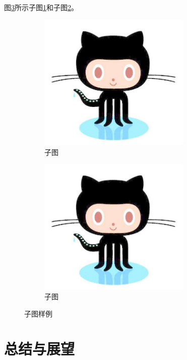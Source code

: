 \documentclass[winfonts,phd,twoside]{njuthesis}
\begin{document}
图\ref{fig:sub}所示子图\ref{subfig:a}和子图\ref{subfig:b}。
\begin{figure}[H]
	\begin{subfigure}{.5\textwidth}
		\centering
		\includegraphics[width=0.8\textwidth]{./figure/github.jpg}
		\caption{子图}
		\label{subfig:a}
	\end{subfigure}
	\begin{subfigure}{.5\textwidth}
		\centering
		\includegraphics[width=0.8\textwidth]{./figure/github.jpg}
		\caption{子图}
		\label{subfig:b}
	\end{subfigure}
\caption{子图样例}
\label{fig:sub}
\end{figure}

\chapter{总结与展望}
\lipsum[1]
\end{document}
